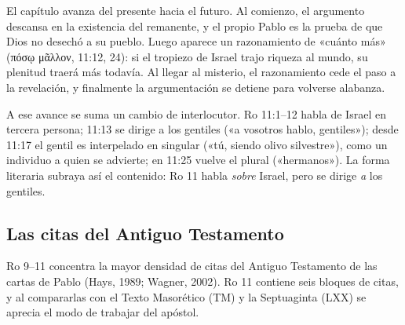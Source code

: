 \documentclass[11pt,letterpaper]{article}
\newcommand{\grc}[1]{\foreignlanguage{ancientgreek}{#1}}
\begin{document}
El capítulo avanza del presente hacia el futuro. Al comienzo, el argumento descansa en la existencia del remanente, y el propio Pablo es la prueba de que Dios no desechó a su pueblo. Luego aparece un razonamiento de «cuánto más» (\grc{πόσῳ μᾶλλον}, 11:12, 24): si el tropiezo de Israel trajo riqueza al mundo, su plenitud traerá más todavía. Al llegar al misterio, el razonamiento cede el paso a la revelación, y finalmente la argumentación se detiene para volverse alabanza.

A ese avance se suma un cambio de interlocutor. Ro 11:1--12 habla de Israel en tercera persona; 11:13 se dirige a los gentiles («a vosotros hablo, gentiles»); desde 11:17 el gentil es interpelado en singular («tú, siendo olivo silvestre»), como un individuo a quien se advierte; en 11:25 vuelve el plural («hermanos»). La forma literaria subraya así el contenido: Ro 11 habla \emph{sobre} Israel, pero se dirige \emph{a} los gentiles.

\subsection{Las citas del Antiguo Testamento}
Ro 9--11 concentra la mayor densidad de citas del Antiguo Testamento de las cartas de Pablo (Hays, 1989; Wagner, 2002). Ro 11 contiene seis bloques de citas, y al compararlas con el Texto Masorético (TM) y la Septuaginta (LXX) se aprecia el modo de trabajar del apóstol.
\end{document}
